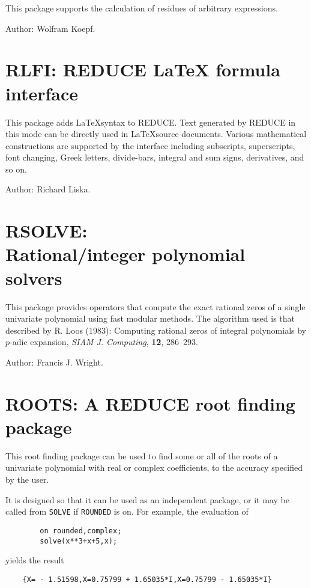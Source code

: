 This package supports the calculation of residues of arbitrary
expressions.

Author: Wolfram Koepf.

\section{RLFI: REDUCE LaTeX formula interface} 

This package adds \LaTeX syntax to REDUCE.  Text generated by REDUCE in
this mode can be directly used in \LaTeX source documents.  Various
mathematical constructions are supported by the interface including
subscripts, superscripts, font changing, Greek letters, divide-bars,
integral and sum signs, derivatives, and so on.

Author: Richard Liska.

\section[RSOLVE: Rational/integer polynomial solvers]%
        {RSOLVE: \protect\\ Rational/integer polynomial solvers}

This package provides operators that compute the exact rational zeros
of a single univariate polynomial using fast modular methods.  The
algorithm used is that described by R. Loos (1983): Computing rational
zeros of integral polynomials by $p$-adic expansion, {\it SIAM J.
Computing}, {\bf 12}, 286--293.

Author: Francis J. Wright.

\section{ROOTS: A REDUCE root finding package} 

This root finding package can be used to find some or all of the roots of a
univariate polynomial with real or complex coefficients, to the accuracy
specified by the user.

It is designed so that it can be used as an independent package, or it may
be called from {\tt SOLVE} if {\tt ROUNDED} is on. For example,
the evaluation of
\begin{verbatim}
        on rounded,complex;
        solve(x**3+x+5,x);
\end{verbatim}
yields the result
\begin{verbatim}
    {X= - 1.51598,X=0.75799 + 1.65035*I,X=0.75799 - 1.65035*I}
\end{verbatim}

